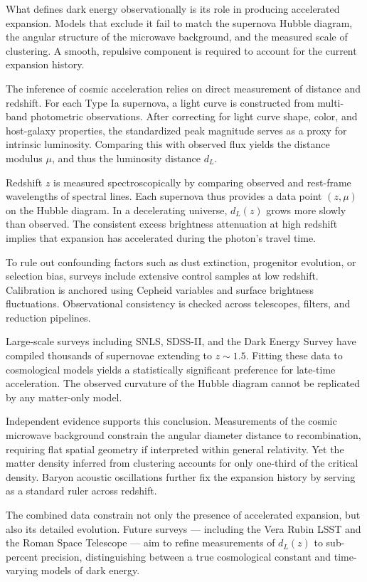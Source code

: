 What defines dark energy observationally is its role in producing accelerated expansion. Models that exclude it fail to match the supernova Hubble diagram, the angular structure of the microwave background, and the measured scale of clustering. A smooth, repulsive component is required to account for the current expansion history.

The inference of cosmic acceleration relies on direct measurement of distance and redshift. For each Type Ia supernova, a light curve is constructed from multi-band photometric observations. After correcting for light curve shape, color, and host-galaxy properties, the standardized peak magnitude serves as a proxy for intrinsic luminosity. Comparing this with observed flux yields the distance modulus $\mu$, and thus the luminosity distance $d_L$.

Redshift $z$ is measured spectroscopically by comparing observed and rest-frame wavelengths of spectral lines. Each supernova thus provides a data point $(z, \mu)$ on the Hubble diagram. In a decelerating universe, $d_L(z)$ grows more slowly than observed. The consistent excess brightness attenuation at high redshift implies that expansion has accelerated during the photon's travel time.

To rule out confounding factors such as dust extinction, progenitor evolution, or selection bias, surveys include extensive control samples at low redshift. Calibration is anchored using Cepheid variables and surface brightness fluctuations. Observational consistency is checked across telescopes, filters, and reduction pipelines.

Large-scale surveys including SNLS, SDSS-II, and the Dark Energy Survey have compiled thousands of supernovae extending to $z \sim 1.5$. Fitting these data to cosmological models yields a statistically significant preference for late-time acceleration. The observed curvature of the Hubble diagram cannot be replicated by any matter-only model.

Independent evidence supports this conclusion. Measurements of the cosmic microwave background constrain the angular diameter distance to recombination, requiring flat spatial geometry if interpreted within general relativity. Yet the matter density inferred from clustering accounts for only one-third of the critical density. Baryon acoustic oscillations further fix the expansion history by serving as a standard ruler across redshift.

The combined data constrain not only the presence of accelerated expansion, but also its detailed evolution. Future surveys — including the Vera Rubin LSST and the Roman Space Telescope — aim to refine measurements of $d_L(z)$ to sub-percent precision, distinguishing between a true cosmological constant and time-varying models of dark energy.

